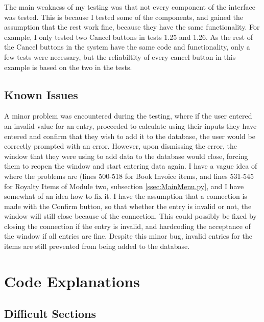 The main weakness of my testing was that not every component of the interface was tested. This is because I tested some of the components, and gained the assumption that the rest work fine, because they have the same functionality. For example, I only tested two Cancel buttons in tests 1.25 and 1.26. As the rest of the Cancel buttons in the system have the same code and functionality, only a few tests were necessary, but the reliabiltity of every cancel button in this example is based on the two in the tests.

\subsection{Known Issues}

A minor problem was encountered during the testing, where if the user entered an invalid value for an entry, proceeded to calculate using their inputs they have entered and confirm that they wish to add it to the database, the user would be correctly prompted with an error. However, upon dismissing the error, the window that they were using to add data to the database would close, forcing them to reopen the window and start entering data again. I have a vague idea of where the problems are (lines 500-518 for Book Invoice items, and lines 531-545 for Royalty Items of Module two, subsection \ref{ssec:MainMenu.py}, and I have somewhat of an idea how to fix it. I have the assumption that a connection is made with the Confirm button, so that whether the entry is invalid or not, the window will still close because of the connection. This could possibly be fixed by closing the connection if the entry is invalid, and hardcoding the acceptance of the window if all entries are fine. Despite this minor bug, invalid entries for the items are still prevented from being added to the database.

\section{Code Explanations}

\subsection{Difficult Sections}

